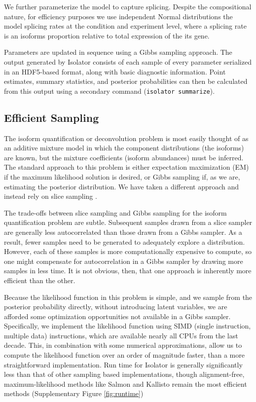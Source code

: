 \documentclass[twocolumn]{article}
\begin{document}
We further parameterize the model to capture splicing. Despite the
compositional nature, for efficiency purposes we use independent Normal
distributions the model splicing rates at the condition and experiment
level, where a splicing rate is an isoforms proportion relative to total
expression of the its gene.

Parameters are updated in sequence using a Gibbs sampling approach. The output
generated by Isolator consists of each sample of every parameter serialized in
an HDF5-based format, along with basic diagnostic information.  Point estimates,
summary statistics, and posterior probabilities can then be calculated from this
output using a secondary command (\texttt{isolator summarize}).

\subsection{Efficient Sampling}\label{efficient-sampling}

The isoform quantification or deconvolution problem is most easily
thought of as an additive mixture model in which the component
distributions (the isoforms) are known, but the mixture coefficients
(isoform abundances) must be inferred. The standard approach to this
problem is either expectation maximization (EM) if the maximum likelihood
solution is desired, or Gibbs sampling if, as we are, estimating the
posterior distribution. We have taken a different approach and instead
rely on slice sampling \cite{Neal:2000uc}.

The trade-offs between slice sampling and Gibbs sampling for the isoform
quantification problem are subtle. Subsequent samples drawn from a slice
sampler are generally less autocorrelated than those drawn from a Gibbs
sampler. As a result, fewer samples need to be generated to adequately
explore a distribution. However, each of these samples is more
computationally expensive to compute, so one might compensate for
autocorrelation in a Gibbs sampler by drawing more samples in less time.
It is not obvious, then, that one approach is inherently more efficient
than the other.

Because the likelihood function in this problem is simple, and we sample from
the posterior probability directly, without introducing latent variables, we are
afforded some optimization opportunities not available in a Gibbs sampler.
Specifically, we implement the likelihood function using SIMD (single
instruction, multiple data) instructions, which are available nearly all CPUs
from the last decade. This, in combination with some numerical approximations,
allow us to compute the likelihood function over an order of magnitude faster,
than a more straightforward implementation. Run time for Isolator is generally
significantly less than that of other sampling based implementations, though
alignment-free, maximum-likelihood methods like Salmon and Kallisto remain the
most efficient methods (Supplementary Figure \ref{fig:runtime})
\end{document}
